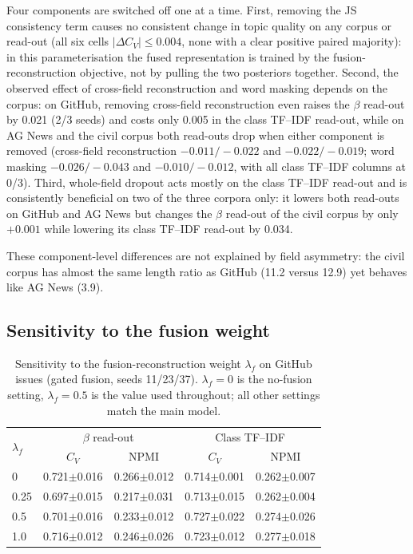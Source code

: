 \documentclass[pdflatex,sn-basic]{sn-jnl}
\begin{document}
Four components are switched off one at a time. First, removing the JS consistency term causes no
consistent change in topic quality on any corpus or read-out (all six cells
$|\Delta C_V|\leq0.004$, none with a clear positive paired majority): in this
parameterisation the fused representation is trained by the fusion-reconstruction objective, not by
pulling the two posteriors together. Second, the observed effect of cross-field reconstruction
and word masking depends on the corpus: on GitHub, removing cross-field reconstruction even raises
the $\beta$ read-out by 0.021 (2/3 seeds) and costs only 0.005 in the class TF--IDF read-out, while
on AG News and the civil corpus both read-outs drop when either component is removed (cross-field
reconstruction $-0.011/-0.022$ and $-0.022/-0.019$; word masking $-0.026/-0.043$ and
$-0.010/-0.012$, with all class TF--IDF columns at 0/3). Third, whole-field dropout acts mostly on
the class TF--IDF read-out and is consistently beneficial on two of the three corpora only: it
lowers both read-outs on GitHub
and AG News but changes the $\beta$ read-out of the civil corpus by only $+0.001$ while lowering
its class TF--IDF read-out by 0.034.

These component-level differences are not explained by field asymmetry: the civil corpus has
almost the same length ratio as GitHub (11.2 versus 12.9) yet behaves like AG News (3.9).

\subsection{Sensitivity to the fusion weight}

\begin{table}[t]
\centering
\caption{Sensitivity to the fusion-reconstruction weight $\lambda_f$ on GitHub issues (gated fusion, seeds 11/23/37). $\lambda_f=0$ is the no-fusion setting, $\lambda_f=0.5$ is the value used throughout; all other settings match the main model.}
\label{tab:weight}
\small
\setlength{\tabcolsep}{4pt}
\begin{tabular}{lcccc}
\toprule
\multirow{2}{*}{$\lambda_f$} & \multicolumn{2}{c}{$\beta$ read-out} & \multicolumn{2}{c}{Class TF--IDF} \\
 & $C_V$ & NPMI & $C_V$ & NPMI \\
\midrule
0 & 0.721$\pm$0.016 & 0.266$\pm$0.012 & 0.714$\pm$0.001 & 0.262$\pm$0.007 \\
0.25 & 0.697$\pm$0.015 & 0.217$\pm$0.031 & 0.713$\pm$0.015 & 0.262$\pm$0.004 \\
0.5 & 0.701$\pm$0.016 & 0.233$\pm$0.012 & 0.727$\pm$0.022 & 0.274$\pm$0.026 \\
1.0 & 0.716$\pm$0.012 & 0.246$\pm$0.026 & 0.723$\pm$0.012 & 0.277$\pm$0.018 \\
\bottomrule
\end{tabular}
\end{table}
\end{document}
